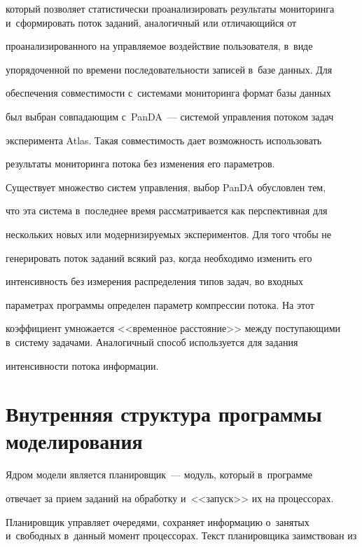 который позволяет статистически проанализировать результаты мониторинга и~сформировать поток заданий, аналогичный или отличающийся от


проанализированного на управляемое воздействие пользователя, в~виде


упорядоченной по времени последовательности записей в~базе данных. Для


обеспечения совместимости с~сис\-те\-ма\-ми мониторинга формат базы данных


был выбран совпадающим с~PanDA~--- сис\-те\-мой управ\-ле\-ния потоком задач


эксперимента Atlas. Такая совместимость дает возможность использовать


результаты мониторинга потока без изменения его параметров.





  Существует множество систем управления, выбор PanDA обусловлен тем,


что эта система в~последнее время рассматривается как перспективная для


нескольких новых или модернизируемых экспериментов. Для того чтобы не


генерировать поток заданий всякий раз, когда необходимо изменить его


интенсивность без измерения распределения типов задач, во входных


параметрах программы определен параметр компрессии потока. На этот


коэффициент умножается <<временн$\acute{\mbox{о}}$е расстояние>> между поступающими в~систему задачами. Аналогичный способ используется для задания


интенсивности потока информации.





\section{Внутренняя структура программы моделирования}





  Ядром модели является планировщик~--- модуль, который в~программе


отвечает за прием заданий на обработку и~<<запуск>> их на процессорах.


Планировщик управляет очередями, сохраняет информацию о~занятых и~свободных в~данный момент процессорах. Текст планировщика заимствован из


